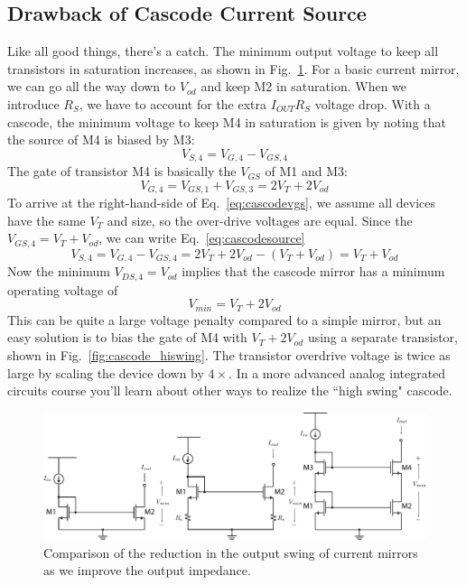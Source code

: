 \subsection{Drawback of Cascode Current Source}
Like all good things, there's a catch.  The minimum output voltage to keep all transistors in saturation increases, as shown in Fig.~\ref{fig:mirrors_vmin}.  For a basic current mirror, we can go all the way down to $V_{od}$ and keep M2 in saturation.  When we introduce $R_S$, we have to account for the extra $I_{OUT} R_S$ voltage drop.  With a cascode, the minimum voltage to keep M4 in saturation is given by noting that the source of M4 is biased by M3:
    \begin{equation}
        V_{S,4} = V_{G,4} - V_{GS,4}
        \label{eq:cascodesource}
    \end{equation}
The gate of transistor M4 is basically the $V_{GS}$ of M1 and M3:
    \begin{equation}
        V_{G,4} = V_{GS,1} + V_{GS,3} = 2 V_T + 2 V_{od}
        \label{eq:cascodevgs}
    \end{equation}
To arrive at the right-hand-side of Eq.~\ref{eq:cascodevgs}, we assume all devices have the same $V_T$ and size, so the over-drive voltages are equal.  Since the $V_{GS,4} = V_T + V_{od}$, we can write Eq.~\ref{eq:cascodesource}
    \begin{equation}
        V_{S,4} = V_{G,4} - V_{GS,4}   = 2 V_T + 2 V_{od} - ( V_T + V_{od} ) = V_T + V_{od}
    \end{equation}
Now the minimum $V_{DS,4} = V_{od}$ implies that the cascode mirror has a minimum operating voltage of
    \begin{equation}
        V_{min} = V_T + 2 V_{od}
    \end{equation}
This can be quite a large voltage penalty compared to a simple mirror, but an easy solution is to bias the gate of M4 with $V_T + 2 V_{od}$ using a separate transistor, shown in Fig.~\ref{fig:cascode_hiswing}.  The transistor overdrive voltage is twice as large by scaling the device down by $4\times$.  In a more advanced analog integrated circuits course you'll learn about other ways to realize the ``high swing" cascode.
\begin{figure}[tb]
\centering
\includegraphics[width=\columnwidth]{mirrors_vmin}
\caption{Comparison of the reduction in the output swing of current mirrors as we improve the output impedance.}
\label{fig:mirrors_vmin}
\end{figure}
